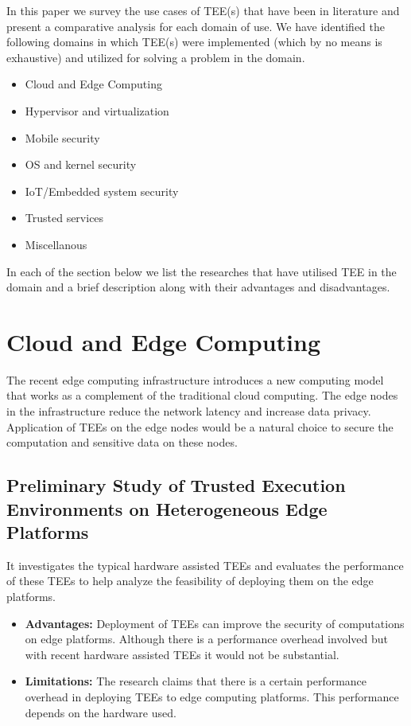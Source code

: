 \documentclass[conference]{IEEEtran}
\begin{document}
In this paper we survey \cite{survey1, survey2, survey3, survey4, survey5} the use cases of TEE(s) that have been in literature and present a comparative analysis for each domain of use. We have identified the following domains in which TEE(s) were implemented (which by no means is exhaustive) and utilized for solving a problem in the domain.
\begin{itemize}
    \item Cloud and Edge Computing
    \item Hypervisor and virtualization
    \item Mobile security
    \item OS and kernel security
    \item IoT/Embedded system security
    \item Trusted services
    \item Miscellanous
\end{itemize}

In each of the section below we list the researches that have utilised TEE in the domain and a brief description along with their advantages and disadvantages.


\section{Cloud and Edge Computing}
The recent edge computing infrastructure introduces a new computing model that works as a complement
of the traditional cloud computing. The edge nodes in the
infrastructure reduce the network latency and increase data privacy.
Application of TEEs on the edge nodes would
be a natural choice to secure the computation and sensitive data
on these nodes.
\subsection{Preliminary Study of Trusted Execution Environments on Heterogeneous Edge Platforms }
\cite{cloud1} It investigates the typical hardware assisted TEEs and evaluates the performance of these TEEs to help analyze the feasibility of deploying them on the edge platforms.
\begin{itemize}
    \item \textbf{Advantages:} Deployment of TEEs can improve the security of computations on edge platforms. Although there is a performance overhead involved but with recent hardware assisted TEEs it would not be substantial.
    \item \textbf{Limitations:} The research claims that there is a certain performance overhead in deploying TEEs to edge computing platforms. This performance depends on the hardware used.
\end{itemize}
\end{document}

